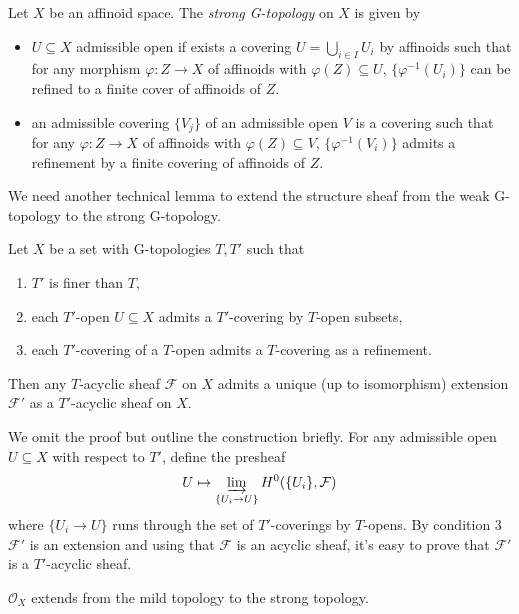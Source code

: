 \documentclass[a4paper]{article}
\newcommand{\sh}[1]{\mathcal{#1}} %
\begin{document}
\begin{definition}
  Let \(X\) be an affinoid space. The \emph{strong G-topology} on \(X\) is given by
  \begin{itemize}
  \item \(U \subseteq X\) admissible open if exists a covering \(U = \bigcup_{i \in I} U_i\) by affinoids such that for any morphism \(\varphi: Z \to X\) of affinoids with \(\varphi(Z) \subseteq U\), \(\{\varphi^{-1}(U_i)\}\) can be refined to a finite cover of affinoids of \(Z\).
  \item an admissible covering \(\{V_j\}\) of an admissible open \(V\) is a covering such that for any \(\varphi: Z \to X\) of affinoids with \(\varphi(Z) \subseteq V\), \(\{\varphi^{-1}(V_i)\}\) admits a refinement by a finite covering of affinoids of \(Z\).
  \end{itemize}
\end{definition}

We need another technical lemma to extend the structure sheaf from the weak G-topology to the strong G-topology.

\begin{lemma}
  Let \(X\) be a set with G-topologies \(T, T'\) such that
  \begin{enumerate}
  \item \(T'\) is finer than \(T\),
  \item each \(T'\)-open \(U \subseteq X\) admits a \(T'\)-covering by \(T\)-open subsets,
  \item each \(T'\)-covering of a \(T\)-open admits a \(T\)-covering as a refinement.
  \end{enumerate}
  Then any \(T\)-acyclic sheaf \(\sh F\) on \(X\) admits a unique (up to isomorphism) extension \(\sh F'\) as a \(T'\)-acyclic sheaf on \(X\).
\end{lemma}

We omit the proof but outline the construction briefly. For any admissible open \(U \subseteq X\) with respect to \(T'\), define the presheaf
\[
  U \mapsto \varinjlim_{\{U_i \to U\}} H^0(\{U_i\}, \sh F)
\]
where \(\{U_i \to U\}\) runs through the set of \(T'\)-coverings by \(T\)-opens. By condition 3 \(\sh F'\) is an extension and using that \(\sh F\) is an acyclic sheaf, it's easy to prove that \(\sh F'\) is a \(T'\)-acyclic sheaf.

\begin{corollary}
  \(\sh O_X\) extends from the mild topology to the strong topology.
\end{corollary}
\end{document}
